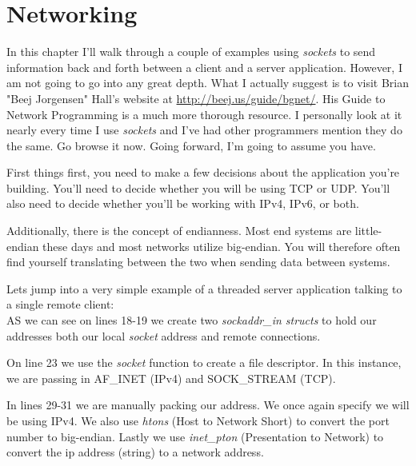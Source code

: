 \documentclass[../main.tex]{subfiles}
\begin{document}
	\chapter{Networking}\label{ch:networking}
	In this chapter I'll walk through a couple of examples using \textit{sockets} to send information back and forth between a client and a server application.  However, I am not going to go into any great depth.  What I actually suggest is to visit Brian "Beej Jorgensen" Hall's website at \url{http://beej.us/guide/bgnet/}.  His Guide to Network Programming \cite{beej_network_programming} is a much more thorough resource.  I personally look at it nearly every time I use \textit{sockets} and I've had other programmers mention they do the same. Go browse it now.  Going forward, I'm going to assume you have.
	
	First things first, you need to make a few decisions about the application you're building.  You'll need to decide whether you will be using TCP or UDP. You'll also need to decide whether you'll be working with IPv4, IPv6, or both.
	
	Additionally, there is the concept of endianness.  Most end systems are little-endian these days and most networks utilize big-endian.  You will therefore often find yourself translating between the two when sending data between systems.
	
	Lets jump into a very simple example of a threaded server application talking to a single remote client: \\
	
	
	
	AS we can see on lines 18-19 we create two \textit{sockaddr\_in structs} to hold our addresses both our local \textit{socket} address and remote connections.  
	
	On line 23 we use the \textit{socket} function to create a file descriptor.  In this instance, we are passing in AF_INET (IPv4) and SOCK_STREAM (TCP).
	
	In lines 29-31 we are manually packing our address.  We once again specify we will be using IPv4.  We also use \textit{htons} (Host to Network Short) to convert the port number to big-endian.  Lastly we use \textit{inet\_pton} (Presentation to Network) to convert the ip address (string) to a network address.
	
\end{document}
